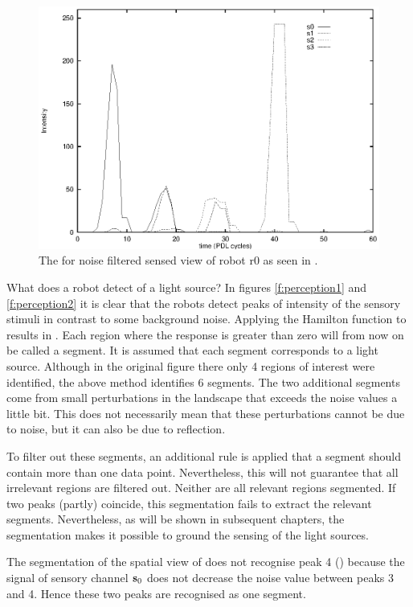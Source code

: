 \begin{figure}[t]
\centerline{\includegraphics[width=12cm]{lang_games/region1.eps}}
\caption{The for noise filtered sensed view of robot r0 as seen in .}
\label{f:region1}
\end{figure}

What does a robot detect of a light source? In figures \ref{f:perception1} and \ref{f:perception2} it is clear that the robots detect peaks of intensity of the sensory stimuli in contrast to some background noise. Applying the Hamilton function to  results in . Each region where the response is greater than zero will from now on be called a segment. It is assumed that each segment corresponds to a light source. Although in the original figure there only 4 regions of interest were identified, the above method identifies 6 segments. The two additional segments come from small perturbations in the landscape that exceeds the noise values a little bit. This does not necessarily mean that these perturbations cannot be due to noise, but it can also be due to reflection.

To filter out these segments, an additional rule is applied that a segment should contain more than one data point. Nevertheless, this will not guarantee that all irrelevant regions are filtered out. Neither are all relevant regions segmented. If two peaks (partly) coincide, this segmentation fails to extract the relevant segments. Nevertheless, as will be shown in subsequent chapters, the segmentation makes it possible to ground the sensing of the light sources.

The segmentation of the spatial view of  does not recognise peak 4 () because the signal of sensory channel ${\bf s}_0$ does not decrease the noise value between peaks 3 and 4. Hence these two peaks are recognised as one segment.

